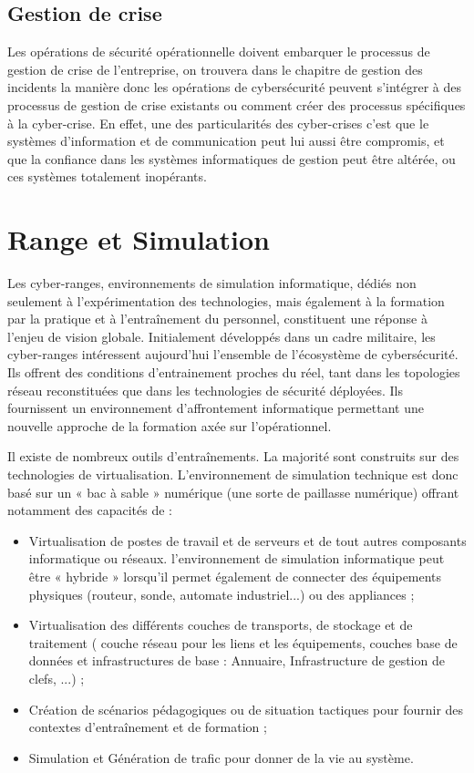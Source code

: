 \subsection{Gestion de crise}

Les opérations de sécurité opérationnelle doivent embarquer le processus de gestion de crise de l'entreprise, on trouvera dans le chapitre de gestion des incidents la manière donc les opérations de cybersécurité peuvent s'intégrer à des processus de gestion de crise existants ou comment créer des processus spécifiques à la cyber-crise. En effet, une des particularités des cyber-crises c'est que le systèmes d'information et de communication peut lui aussi être compromis, et que la confiance dans les systèmes informatiques de gestion peut être altérée, ou ces systèmes totalement inopérants.  

\section{Range et Simulation}

Les cyber-ranges, environnements de simulation informatique, dédiés non seulement à l’expérimentation des technologies, mais également à la formation par la pratique et à l’entraînement du personnel, constituent une réponse à l'enjeu de vision globale.  Initialement développés dans un cadre militaire,  les  cyber-ranges intéressent aujourd'hui l’ensemble de l’écosystème de cybersécurité. Ils offrent des conditions d’entrainement proches du réel, tant dans les topologies réseau reconstituées que dans les technologies de sécurité déployées. Ils fournissent un environnement d’affrontement informatique permettant une nouvelle approche de la formation axée sur l’opérationnel.

Il existe de nombreux outils d'entraînements. La majorité sont construits sur des technologies de virtualisation.
L’environnement de simulation technique est donc basé sur un « bac à sable » numérique (une sorte de paillasse numérique) offrant notamment des capacités de :
\begin{itemize}
  \item Virtualisation de postes de travail et de serveurs  et de tout autres composants informatique ou réseaux. l'environnement de simulation informatique peut être  « hybride » lorsqu’il permet également de connecter des équipements physiques (routeur, sonde, automate industriel...) ou des appliances ;
  \item Virtualisation des différents couches de transports, de stockage et de traitement ( couche réseau pour les liens et les équipements, couches base de données et infrastructures de base : Annuaire, Infrastructure de gestion de clefs, ...) ; 
  \item  Création de scénarios pédagogiques ou de situation tactiques pour fournir des contextes d'entraînement et de formation ;
  \item  Simulation et Génération de trafic pour donner de la vie au système.

\end{itemize}

